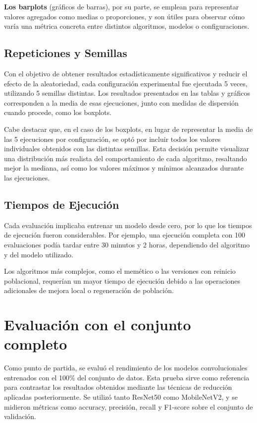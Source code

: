 \textbf{Los barplots} (gráficos de barras), por su parte, se emplean para representar valores agregados como medias o proporciones,
y son útiles para observar cómo varía una métrica concreta entre distintos algoritmos, modelos o configuraciones.

\subsection{Repeticiones y Semillas}\label{sec:repeticiones-y-semillas}
Con el objetivo de obtener resultados estadísticamente significativos y reducir el efecto de la aleatoriedad,
cada configuración experimental fue ejecutada 5 veces, utilizando 5 semillas distintas.
Los resultados presentados en las tablas y gráficos corresponden a la media de esas ejecuciones,
junto con medidas de dispersión cuando procede, como los boxplots.

Cabe destacar que, en el caso de los boxplots, en lugar de representar la media de las 5 ejecuciones por configuración,
se optó por incluir todos los valores individuales obtenidos con las distintas semillas.
Esta decisión permite visualizar una distribución más realista del comportamiento de cada algoritmo,
resaltando mejor la mediana, así como los valores máximos y mínimos alcanzados durante las ejecuciones.

\subsection{Tiempos de Ejecución}\label{sec:tiempos-de-ejecucion}
Cada evaluación implicaba entrenar un modelo desde cero, por lo que los tiempos de ejecución fueron considerables.
Por ejemplo, una ejecución completa con 100 evaluaciones podía tardar entre 30 minutos y 2 horas,
dependiendo del algoritmo y del modelo utilizado.

Los algoritmos más complejos, como el memético o las versiones con reinicio poblacional,
requerían un mayor tiempo de ejecución debido a las operaciones adicionales de mejora local o regeneración de población.


\section{Evaluación con el conjunto completo}\label{sec:evaluacion-con-el-conjunto-completo}
Como punto de partida, se evaluó el rendimiento de los modelos convolucionales entrenados con el 100\% del conjunto de datos.
Esta prueba sirve como referencia para contrastar los resultados obtenidos mediante las técnicas de reducción aplicadas posteriormente.
Se utilizó tanto ResNet50 como MobileNetV2, y se midieron métricas como accuracy, precisión, recall y F1-score sobre el conjunto de validación.

